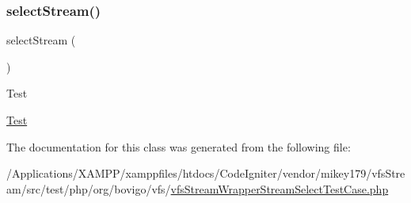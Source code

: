 \subsubsection{\texorpdfstring{select\+Stream()}{selectStream()}}
{\footnotesize\ttfamily select\+Stream (\begin{DoxyParamCaption}{ }\end{DoxyParamCaption})}

\begin{DoxyRefDesc}{Test}
\item[\mbox{\hyperlink{test__test000245}{Test}}]\end{DoxyRefDesc}


The documentation for this class was generated from the following file\+:\begin{DoxyCompactItemize}
\item 
/\+Applications/\+X\+A\+M\+P\+P/xamppfiles/htdocs/\+Code\+Igniter/vendor/mikey179/vfs\+Stream/src/test/php/org/bovigo/vfs/\mbox{\hyperlink{vfs_stream_wrapper_stream_select_test_case_8php}{vfs\+Stream\+Wrapper\+Stream\+Select\+Test\+Case.\+php}}\end{DoxyCompactItemize}
